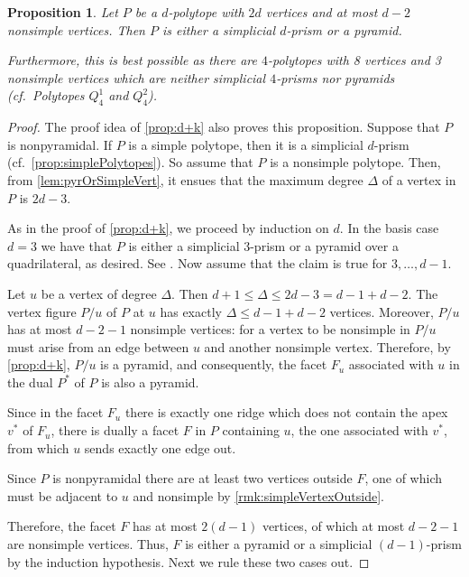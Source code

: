 \documentclass[a4paper]{amsart}
\newtheorem{proposition}[theorem]{Proposition}
\theoremstyle{definition}
\theoremstyle{remark}
\begin{document}
\begin{proposition}
\label{prop:d+d} Let $P$ be a $d$-polytope with $2d$ vertices and at most $d-2$ nonsimple vertices. Then $P$ is either a simplicial $d$-prism or a pyramid.

Furthermore, this is best possible as there are $4$-polytopes with 8 vertices and 3 nonsimple vertices which are neither simplicial $4$-prisms nor pyramids (cf.~Polytopes $Q_4^1$ and $Q_4^2$).
\end{proposition}

\begin{proof} The proof idea of \cref{prop:d+k} also proves this proposition. Suppose that $P$ is nonpyramidal. If $P$ is a simple polytope, then it is a simplicial $d$-prism (cf.~\cref{prop:simplePolytopes}). So assume that $P$ is a nonsimple polytope. Then, from \cref{lem:pyrOrSimpleVert}, it ensues that the maximum degree $\Delta$ of a vertex in $P$ is $2d-3$. 

As in the proof of \cref{prop:d+k}, we proceed by induction on $d$.  In the  basis case $d=3$ we have that $P$ is either a simplicial 3-prism or a pyramid over a quadrilateral, as desired. See \cite[Fig.~2]{BriDun73}.   Now assume that the claim is true for $3,\ldots,d-1$. 

Let $u$ be a vertex of degree  ${\Delta}$. Then $d+1\le {\Delta}\le 2d-3=d-1+d-2$.  The vertex figure $P/u$ of $P$ at $u$ has exactly ${\Delta}\le d-1+d-2$ vertices. Moreover,  $P/u$  has at most $d-2-1$ nonsimple vertices: for a vertex to be nonsimple in $P/u$ must arise from an edge between $u$ and another nonsimple vertex. Therefore, by \cref{prop:d+k}, $P/u$ is a pyramid, and consequently, the facet $F_u$ associated with $u$ in the dual $P^*$ of $P$ is also a pyramid. 

Since in the facet $F_u$ there is exactly one ridge which does not contain the apex $v^*$ of $F_u$, there is  dually a facet $F$ in $P$ containing $u$, the one associated with $v^*$,  from which $u$ sends exactly one edge out.

 Since $P$ is nonpyramidal there are at least two vertices outside $F$, one of which must be adjacent to $u$ and nonsimple by \cref{rmk:simpleVertexOutside}.   
 
 Therefore, the facet $F$ has at most $2(d-1)$ vertices, of which at most $d-2-1$ are nonsimple vertices. Thus, $F$ is either a pyramid or a simplicial $(d-1)$-prism by the induction hypothesis. Next we rule these two cases out.
 

\end{proof}
\end{document}
